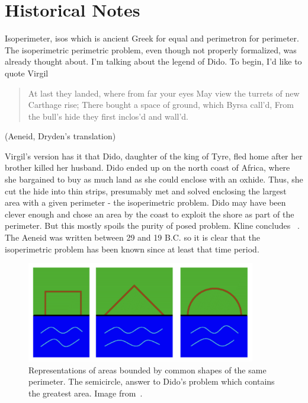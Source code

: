 \documentclass[a4paper]{book}
\begin{document}
\section*{Historical Notes}
Isoperimeter, isos which is ancient Greek for equal and perimetron for perimeter. The isoperimetric perimetric problem, even though not properly formalized, was already thought about. I'm talking about the legend of Dido. To begin, I'd like to quote Virgil
\begin{center}
    \begin{quote}
        At last they landed, where from far your eyes
        May view the turrets of new Carthage rise;
        There bought a space of ground, which Byrsa call'd,
        From the bull's hide they first inclos'd and wall'd.
    \end{quote}
    (Aeneid, Dryden’s translation)
\end{center}
Virgil's version has it that Dido, daughter of the king of Tyre, fled home after her brother killed her husband. Dido ended up on the north coast of Africa, where she bargained to buy as much land as she could enclose with an oxhide. Thus, she cut the hide into thin strips, presumably met and solved enclosing the largest area with a given perimeter - the isoperimetric problem. Dido may have been clever enough and chose an area by the coast to exploit the shore as part of the perimeter. But this mostly spoils the purity of posed problem. Kline concludes ~\cite{kline1985mathematics}. The Aeneid was written between 29 and 19 B.C. so it is clear that the isoperimetric problem has been known since at least that time period.
\begin{figure}[h]
    \begin{center}   
        \includegraphics[width=100mm]{dido_1}
        \caption{Representations of areas bounded by common shapes of the same perimeter. The semicircle, answer to Dido's problem which contains the greatest area. Image from~\cite{demjanenko2008isoperimetric}.}
    \end{center}
\end{figure}
\end{document}
